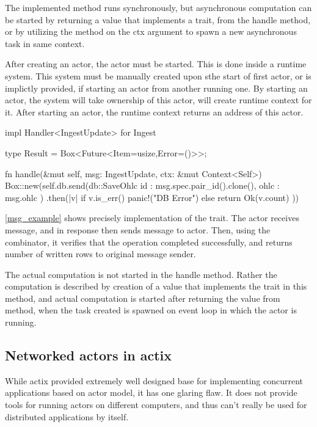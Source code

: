 The implemented  method runs synchronously, but asynchronous computation
can be started by returning a value that implements a   trait, from the handle method, or by utilizing the 
method on the ctx argument to spawn a new asynchronous task in same context.

After creating an actor, the actor must be started. This is done inside a runtime system. This system must be manually created
upon sthe start of first actor, or is implictly provided, if starting an actor from another running one. By starting
an actor, the system will take ownership of this actor, will create runtime context for it. After starting an actor, the runtime
context returns an address of this actor.


\begin{code}[language=rust,label={msg_example},caption={Asynchronous message handling example}]
    impl Handler<IngestUpdate> for Ingest {
        type Result = Box<Future<Item=usize,Error=()>>;

        fn handle(&mut self, msg: IngestUpdate, ctx: &mut Context<Self>) {
            Box::new(self.db.send(db::SaveOhlc{
                id : msg.spec.pair_id().clone(),
                ohlc : msg.ohlc
            })
            .then(|v| if v.is_err() { panic!("DB Error")} else { return Ok(v.count) }))
        }
    }
\end{code}

\autoref{msg_example} shows precisely implementation of the  trait. The  actor receives  message,
and in response then sends  message to  actor. Then, using the  combinator, it
verifies that the operation completed successfully, and returns number of written rows to original message sender.

The actual computation is not started in the handle method. Rather the computation is described by creation
of a value that implements the  trait in this method, and actual computation is started after returning
the value from  method, when the task created is spawned on event loop in which the actor is running.


\subsection{Networked actors in actix}
While actix provided extremely well designed base for implementing concurrent applications based on actor model, it has
one glaring flaw. It does not provide tools for running actors on different computers, and thus can't really be used for
distributed applications by itself.

